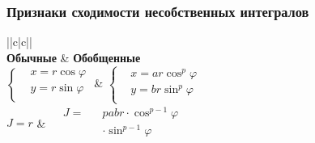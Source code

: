 \subsubsection{Признаки сходимости несобственных интегралов}
\begin{tabu}[t]{||c|c||}
	\hline
		 \\
	\hline
		\textbf{Обычные} &
		\textbf{Обобщенные} \\
	\hline
	\hline
		$\displaystyle \left\{\begin{aligned}
			&x = r\cos \varphi \\
			&y = r\sin \varphi \\
		\end{aligned}\right.$ &
		$\displaystyle \left\{\begin{aligned}
			&x = ar\cos^p \varphi \\
			&y = br\sin^p \varphi \\
		\end{aligned}\right.$ \\
	\hline
		$\displaystyle J = r $ &
		$\displaystyle \begin{aligned}
			&J = &&pabr\cdot\cos^{p-1}\varphi \\
			& &&\cdot\sin^{p-1}\varphi \\
		\end{aligned} $ \\
	\hline
		 \\
	\hline
		 \\
	\hline
\end{tabu}
